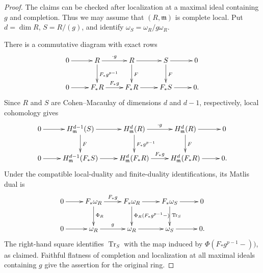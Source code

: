 \documentclass[reqno,11pt]{amsart}
\numberwithin{equation}{section}
\theoremstyle{definition}
\theoremstyle{definition}
\theoremstyle{definition}
\theoremstyle{remark}
\newcommand{\fm}{\mathfrak{m}}
\begin{document}
\begin{proof}
    The claims can be checked after localization at a maximal
    ideal containing $g$ and completion. Thus we may assume that
    $(R,\fm)$ is complete local. Put $d=\dim R$, $S = R/(g)$,
    and identify $\omega_{S}=\omega_R/g\omega_R$.

    There is a commutative diagram with exact rows
    \[
    \xymatrix{
    0\ar[r] & R\ar[r]^{\cdot g}\ar[d]^{F_*g^{p-1}}
      & R\ar[r]\ar[d]^{F} & S\ar[r]\ar[d]^{F} & 0\\
    0\ar[r] & F_*R\ar[r]^{F_*g}
      & F_*R\ar[r] & F_*S\ar[r] & 0.
    }
    \]
    Since $R$ and $S$ are Cohen--Macaulay of dimensions $d$ and $d-1$, respectively, local cohomology gives
    \[
    \xymatrix{
    0\ar[r] & H^{d-1}_{\mathfrak m}(S)\ar[r]\ar[d]^F
      & H^d_{\mathfrak m}(R)\ar[r]^{\cdot g}\ar[d]^{F_*g^{p-1}}
      & H^d_{\mathfrak m}(R)\ar[r]\ar[d]^F & 0\\
    0\ar[r] & H^{d-1}_{\mathfrak m}(F_*S)\ar[r]
      & H^d_{\mathfrak m}(F_*R)\ar[r]^{F_*g}
      & H^d_{\mathfrak m}(F_*R)\ar[r] & 0.
    }
    \]
    Under the compatible local-duality and finite-duality identifications, its Matlis dual is
    \[
    \xymatrix{
    0\ar[r] & F_*\omega_R\ar[r]^{F_*g}\ar[d]^{\Phi_R}
      & F_*\omega_R\ar[r]\ar[d]^{\Phi_R(F_*g^{p-1}-)}
      & F_*\omega_S\ar[r]\ar[d]^{\operatorname{Tr}_{S}} & 0\\
    0\ar[r] & \omega_R\ar[r]^{g}
      & \omega_R\ar[r] & \omega_S\ar[r] & 0.
    }
    \]
    The right-hand square identifies $\operatorname{Tr}_{S}$ with the map induced by $\Phi(F_*g^{p-1}-))$, as claimed. Faithful flatness of completion and localization at all maximal ideals containing $g$ give the assertion for the original ring.
\end{proof}
\end{document}
